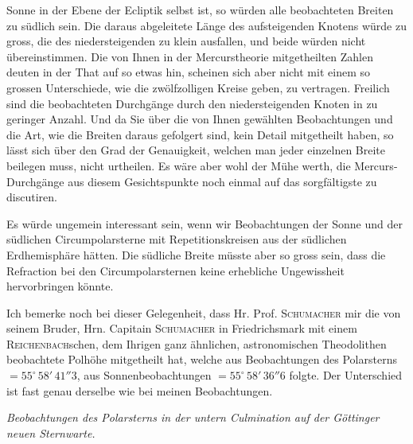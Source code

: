 Sonne in der Ebene der Ecliptik selbst ist, so würden alle beobachteten Breiten zu
südlich sein. Die daraus abgeleitete Länge des aufsteigenden Knotens würde zu gross,
die des niedersteigenden zu klein ausfallen, und beide würden nicht übereinstimmen.
Die von Ihnen in der Mercurstheorie mitgetheilten Zahlen deuten in der That auf so
etwas hin, scheinen sich aber nicht mit einem so grossen Unterschiede, wie die
zwölfzolligen Kreise geben, zu vertragen. Freilich sind die beobachteten Durchgänge
durch den niedersteigenden Knoten in zu geringer Anzahl. Und da Sie über die von
Ihnen gewählten Beobachtungen und die Art, wie die Breiten daraus gefolgert sind,
kein Detail mitgetheilt haben, so lässt sich über den Grad der Genauigkeit, welchen
man jeder einzelnen Breite beilegen muss, nicht urtheilen. Es wäre aber wohl der
Mühe werth, die Mercurs-Durchgänge aus diesem Gesichtspunkte noch einmal auf das
sorgfältigste zu discutiren.

\par\indent Es würde ungemein interessant sein, wenn wir Beobachtungen der Sonne und der
südlichen Circumpolarsterne mit Repetitionskreisen aus der südlichen Erdhemisphäre
hätten. Die südliche Breite müsste aber so gross sein, dass die Refraction bei den
Circumpolarsternen keine erhebliche Ungewissheit hervorbringen könnte.

\par\indent Ich bemerke noch bei dieser Gelegenheit, dass Hr. Prof. \textsc{Schumacher} mir die
von seinem Bruder, Hrn. Capitain \textsc{Schumacher} in Friedrichsmark mit einem
\textsc{Reichenbach}schen, dem Ihrigen ganz ähnlichen, astronomischen Theodolithen
beobachtete Polhöhe mitgetheilt hat, welche aus Beobachtungen des Polarsterns
$=55^\circ\,58'\,41''3$, aus Sonnenbeobachtungen $=55^\circ\,58'\,36''6$ folgte.
Der Unterschied ist fast genau derselbe wie bei meinen Beobachtungen.

\par\indent\emph{Beobachtungen des Polarsterns in der untern Culmination auf der Göttinger
neuen Sternwarte.}

